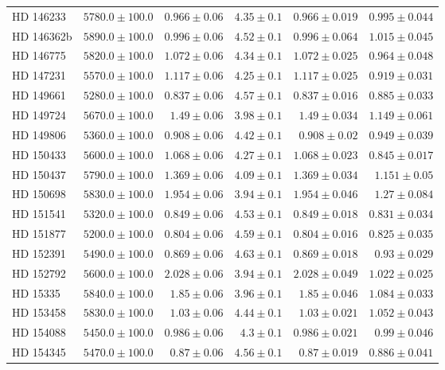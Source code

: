 \begin{longtable*}{lrrrrr}
HD 146233 & $5780.0\pm 100.0$ & $0.966\pm 0.06$ & $4.35\pm 0.1$ & $0.966\pm 0.019$ & $0.995\pm 0.044$ \\ 
HD 146362b & $5890.0\pm 100.0$ & $0.996\pm 0.06$ & $4.52\pm 0.1$ & $0.996\pm 0.064$ & $1.015\pm 0.045$ \\ 
HD 146775 & $5820.0\pm 100.0$ & $1.072\pm 0.06$ & $4.34\pm 0.1$ & $1.072\pm 0.025$ & $0.964\pm 0.048$ \\ 
HD 147231 & $5570.0\pm 100.0$ & $1.117\pm 0.06$ & $4.25\pm 0.1$ & $1.117\pm 0.025$ & $0.919\pm 0.031$ \\ 
HD 149661 & $5280.0\pm 100.0$ & $0.837\pm 0.06$ & $4.57\pm 0.1$ & $0.837\pm 0.016$ & $0.885\pm 0.033$ \\ 
HD 149724 & $5670.0\pm 100.0$ & $1.49\pm 0.06$ & $3.98\pm 0.1$ & $1.49\pm 0.034$ & $1.149\pm 0.061$ \\ 
HD 149806 & $5360.0\pm 100.0$ & $0.908\pm 0.06$ & $4.42\pm 0.1$ & $0.908\pm 0.02$ & $0.949\pm 0.039$ \\ 
HD 150433 & $5600.0\pm 100.0$ & $1.068\pm 0.06$ & $4.27\pm 0.1$ & $1.068\pm 0.023$ & $0.845\pm 0.017$ \\ 
HD 150437 & $5790.0\pm 100.0$ & $1.369\pm 0.06$ & $4.09\pm 0.1$ & $1.369\pm 0.034$ & $1.151\pm 0.05$ \\ 
HD 150698 & $5830.0\pm 100.0$ & $1.954\pm 0.06$ & $3.94\pm 0.1$ & $1.954\pm 0.046$ & $1.27\pm 0.084$ \\ 
HD 151541 & $5320.0\pm 100.0$ & $0.849\pm 0.06$ & $4.53\pm 0.1$ & $0.849\pm 0.018$ & $0.831\pm 0.034$ \\ 
HD 151877 & $5200.0\pm 100.0$ & $0.804\pm 0.06$ & $4.59\pm 0.1$ & $0.804\pm 0.016$ & $0.825\pm 0.035$ \\ 
HD 152391 & $5490.0\pm 100.0$ & $0.869\pm 0.06$ & $4.63\pm 0.1$ & $0.869\pm 0.018$ & $0.93\pm 0.029$ \\ 
HD 152792 & $5600.0\pm 100.0$ & $2.028\pm 0.06$ & $3.94\pm 0.1$ & $2.028\pm 0.049$ & $1.022\pm 0.025$ \\ 
HD 15335 & $5840.0\pm 100.0$ & $1.85\pm 0.06$ & $3.96\pm 0.1$ & $1.85\pm 0.046$ & $1.084\pm 0.033$ \\ 
HD 153458 & $5830.0\pm 100.0$ & $1.03\pm 0.06$ & $4.44\pm 0.1$ & $1.03\pm 0.021$ & $1.052\pm 0.043$ \\ 
HD 154088 & $5450.0\pm 100.0$ & $0.986\pm 0.06$ & $4.3\pm 0.1$ & $0.986\pm 0.021$ & $0.99\pm 0.046$ \\ 
HD 154345 & $5470.0\pm 100.0$ & $0.87\pm 0.06$ & $4.56\pm 0.1$ & $0.87\pm 0.019$ & $0.886\pm 0.041$ \\ 

\end{longtable*}
